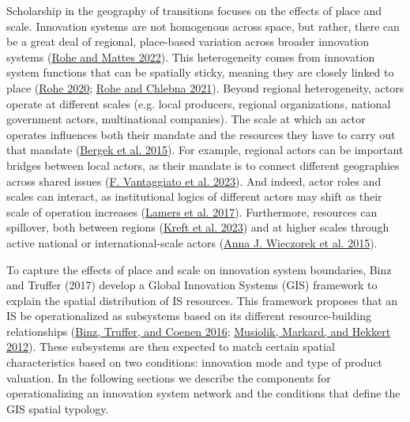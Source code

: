 \documentclass[twoside,12pt,final]{ucthesis-CA2012}
\begin{document}
\begin{ucmainmatter}
Scholarship in the geography of transitions focuses on the effects of
place and scale. Innovation systems are not homogenous across space, but
rather, there can be a great deal of regional, place-based variation
across broader innovation systems
(\protect\hyperlink{ref-Rohe_Mattes_2022}{Rohe and Mattes 2022}). This
heterogeneity comes from innovation system functions that can be
spatially \textquotesingle sticky\textquotesingle, meaning they are closely linked to place
(\protect\hyperlink{ref-Rohe_2020}{Rohe 2020}; \protect\hyperlink{ref-Rohe_Chlebna_2021}{Rohe and Chlebna 2021}).
Beyond regional heterogeneity, actors operate at different scales (e.g.
local producers, regional organizations, national government actors,
multinational companies). The scale at which an actor operates
influences both their mandate and the resources they have to carry out
that mandate
(\protect\hyperlink{ref-Bergek_Hekkert_Jacobsson_Markard_Sanduxe9n_Truffer_2015}{Bergek et al. 2015}).
For example, regional actors can be important bridges between local
actors, as their mandate is to connect different geographies across
shared issues (\protect\hyperlink{ref-Vantaggiato_Lubell_Hummel_Chow_Tcheukam_Siwe_2023}{F. Vantaggiato et al. 2023}). And indeed,
actor roles and scales can interact, as institutional logics of
different actors may shift as their scale of operation increases
(\protect\hyperlink{ref-Lamers_Schut_Klerkx_Van_Asten_2017}{Lamers et al. 2017}). Furthermore,
resources can spillover, both between regions
(\protect\hyperlink{ref-Kreft_Angst_Huber_Finger_2023}{Kreft et al. 2023})
and at higher scales through active national or international-scale
actors
(\protect\hyperlink{ref-Wieczorek_Hekkert_Coenen_Harmsen_2015}{Anna J. Wieczorek et al. 2015}).

To capture the effects of place and scale on innovation system
boundaries, Binz and Truffer (2017) develop a \textquotesingle Global Innovation
Systems\textquotesingle{} (GIS) framework to explain the spatial distribution of IS
resources. This framework proposes that an IS be operationalized as
subsystems based on its different resource-building relationships
(\protect\hyperlink{ref-Binz_Truffer_Coenen_2016}{Binz, Truffer, and Coenen 2016}; \protect\hyperlink{ref-Musiolik_Markard_Hekkert_2012}{Musiolik, Markard, and Hekkert 2012}).
These subsystems are then expected to match certain spatial
characteristics based on two conditions: innovation mode and type of
product valuation. In the following sections we describe the components
for operationalizing an innovation system network and the conditions
that define the GIS spatial typology.


\end{ucmainmatter}
\end{document}
